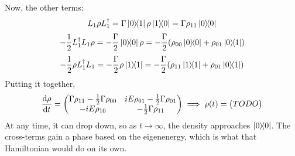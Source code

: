 \begin{example}
\begin{align*}
    \end{align*}
    Now, the other terms:
    \[ L_1 \rho L_1^{\dagger} = \Gamma \ketbra{0}{1} \rho \ketbra{1}{0} = \Gamma \rho_{11} \ketbra{0}{0} \]
    \[ -\frac{1}{2} L_1^{\dagger} L_1 \rho = -\frac{\Gamma}{2} \ketbra{0}{0} \rho = -\frac{\Gamma}{2} \qty(\rho_{00} \ketbra{0}{0} + \rho_{01} \ketbra{0}{1}) \]
    \[ -\frac{1}{2} \rho L_1^{\dagger} L_1 = -\frac{\Gamma}{2} \rho \ketbra{1}{1} = -\frac{\Gamma}{2} \qty(\rho_{11} \ketbra{1} + \rho_{01} \ketbra{0}{1})\]
    Putting it together,
    \[ \dv{\rho}{t} = \begin{pmatrix}
        \Gamma \rho_{11} - \frac{1}{2} \Gamma \rho_{00} & iE\rho_{01} - \frac{1}{2} \Gamma \rho_{01} \\
        -iE \rho_{10} & - \frac{1}{2} \Gamma \rho_{11}
    \end{pmatrix} \implies \rho(t) = \begin{pmatrix}
        TODO
    \end{pmatrix} \]
    At any time, it can drop down, so as $t \to \infty$, the density approaches $\ketbra{0}$. The cross-terms gain a phase based on the eigenenergy,
    which is what that Hamiltonian would do on its own.
\end{example}